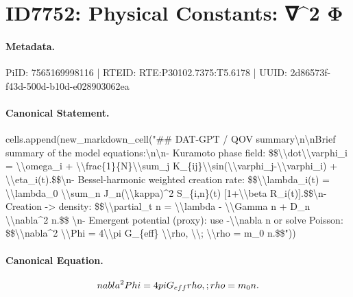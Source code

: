 \section*{ID7752: Physical Constants: ∇\textasciicircum{}2 Φ}
\paragraph{Metadata.}
PiID: 7565169998116 | RTEID: RTE:P30102.7375:T5.6178 | UUID: 2d86573f-f43d-500d-b10d-e028903062ea

\paragraph{Canonical Statement.}
cells.append(new\_markdown\_cell("\#\# DAT-GPT / QOV summary\textbackslash{}n\textbackslash{}nBrief summary of the model equations:\textbackslash{}n\textbackslash{}n- Kuramoto phase field: \$\$\textbackslash{}\textbackslash{}dot\textbackslash{}\textbackslash{}varphi\_i = \textbackslash{}\textbackslash{}omega\_i + \textbackslash{}\textbackslash{}frac\{1\}\{N\}\textbackslash{}\textbackslash{}sum\_j K\_\{ij\}\textbackslash{}\textbackslash{}sin(\textbackslash{}\textbackslash{}varphi\_j-\textbackslash{}\textbackslash{}varphi\_i) + \textbackslash{}\textbackslash{}eta\_i(t).\$\$\textbackslash{}n- Bessel-harmonic weighted creation rate: \$\$\textbackslash{}\textbackslash{}lambda\_i(t) = \textbackslash{}\textbackslash{}lambda\_0 \textbackslash{}\textbackslash{}sum\_n J\_n(\textbackslash{}\textbackslash{}kappa)\textasciicircum{}2 S\_\{i,n\}(t) [1+\textbackslash{}\textbackslash{}beta R\_i(t)].\$\$\textbackslash{}n- Creation -> density: \$\$\textbackslash{}\textbackslash{}partial\_t n = \textbackslash{}\textbackslash{}lambda - \textbackslash{}\textbackslash{}Gamma n + D\_n \textbackslash{}\textbackslash{}nabla\textasciicircum{}2 n.\$\$ \textbackslash{}n- Emergent potential (proxy): use -\textbackslash{}\textbackslash{}nabla n or solve Poisson: \$\$\textbackslash{}\textbackslash{}nabla\textasciicircum{}2 \textbackslash{}\textbackslash{}Phi = 4\textbackslash{}\textbackslash{}pi G\_\{eff\} \textbackslash{}\textbackslash{}rho, \textbackslash{}\textbackslash{}; \textbackslash{}\textbackslash{}rho = m\_0 n.\$\$"))

\paragraph{Canonical Equation.}
\[
\\nabla^2 \\Phi = 4\\pi G_{eff} \\rho, \\; \\rho = m_0 n.
\]

